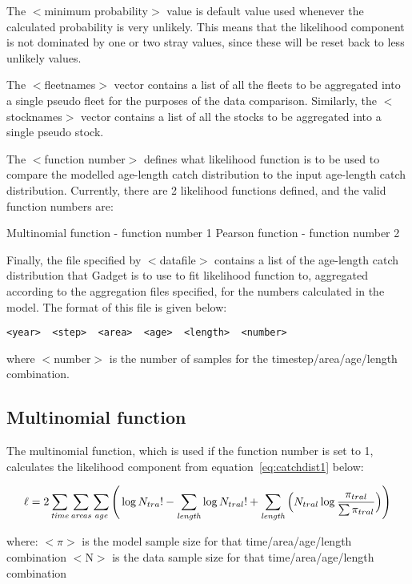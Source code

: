 \documentclass [a4paper, 10pt]{book}
\begin{document}
\bigskip
The $<$minimum probability$>$ value is default value used whenever the calculated probability is very unlikely.  This means that the likelihood component is not dominated by one or two stray values, since these will be reset back to less unlikely values.

\bigskip
The $<$fleetnames$>$ vector contains a list of all the fleets to be aggregated into a single pseudo fleet for the purposes of the data comparison.  Similarly, the $<$stocknames$>$ vector contains a list of all the stocks to be aggregated into a single pseudo stock.

\bigskip
The $<$function number$>$ defines what likelihood function is to be used to compare the modelled age-length catch distribution to the input age-length catch distribution.  Currently, there are 2 likelihood functions defined, and the valid function numbers are:

\bigskip
Multinomial function - function number 1\newline
Pearson function - function number 2

\bigskip
Finally, the file specified by $<$datafile$>$ contains a list of the age-length catch distribution that Gadget is to use to fit likelihood function to, aggregated according to the aggregation files specified, for the numbers calculated in the model.  The format of this file is given below:

\begin{verbatim}
<year>  <step>  <area>  <age>  <length>  <number>
\end{verbatim}

where $<$number$>$ is the number of samples for the timestep/area/age/length combination.

\subsection{Multinomial function}
The multinomial function, which is used if the function number is set to 1, calculates the likelihood component from equation~\ref{eq:catchdist1} below:

\begin{equation}\label{eq:catchdist1}
\ell = 2 \sum_{\it time}\sum_{\it areas}\sum_{\it age} \Bigg( \log N_{tra}! - \sum_{\it length} \log N_{tral}! + \sum_{\it length} \Big( N_{tral} \log {\frac{\pi_{tral}}{\sum \pi_{tral}}} \Big)\Bigg)
\end{equation}

where:\newline
$<$$\pi$$>$ is the model sample size for that time/area/age/length combination\newline
$<$N$>$ is the data sample size for that time/area/age/length combination
\end{document}
